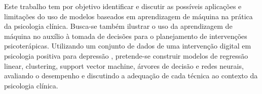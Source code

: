 Este trabalho tem por objetivo identificar e discutir as possíveis aplicações e limitações do uso de modelos baseados em aprendizagem de máquina na prática
da psicologia clínica. Busca-se também ilustrar o uso da aprendizagem de máquina no auxílio à tomada de decisões para o planejamento de intervenções psicoterápicas.
Utilizando um conjunto de dados de uma intervenção digital em psicologia positiva para depressão \cite{Collins2023}, pretende-se construir modelos de regressão linear,
clustering, support vector machine, árvores de decisão e redes neurais, avaliando o desempenho e discutindo a adequação de cada técnica ao contexto da psicologia clínica.